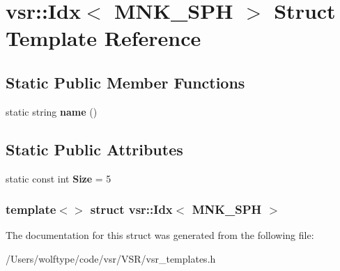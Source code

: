 \hypertarget{structvsr_1_1_idx_3_01_m_n_k___s_p_h_01_4}{\section{vsr\-:\-:Idx$<$ M\-N\-K\-\_\-\-S\-P\-H $>$ Struct Template Reference}
\label{structvsr_1_1_idx_3_01_m_n_k___s_p_h_01_4}
}
\subsection*{Static Public Member Functions}
\begin{DoxyCompactItemize}
\item 
\hypertarget{structvsr_1_1_idx_3_01_m_n_k___s_p_h_01_4_a3ed4e32adf1d5228403242992398bc75}{static string {\bfseries name} ()}\label{structvsr_1_1_idx_3_01_m_n_k___s_p_h_01_4_a3ed4e32adf1d5228403242992398bc75}

\end{DoxyCompactItemize}
\subsection*{Static Public Attributes}
\begin{DoxyCompactItemize}
\item 
\hypertarget{structvsr_1_1_idx_3_01_m_n_k___s_p_h_01_4_a4ff6fd432526189d77ff5dcb978b48ab}{static const int {\bfseries Size} = 5}\label{structvsr_1_1_idx_3_01_m_n_k___s_p_h_01_4_a4ff6fd432526189d77ff5dcb978b48ab}

\end{DoxyCompactItemize}
\subsubsection*{template$<$$>$ struct vsr\-::\-Idx$<$ M\-N\-K\-\_\-\-S\-P\-H $>$}



The documentation for this struct was generated from the following file\-:\begin{DoxyCompactItemize}
\item 
/\-Users/wolftype/code/vsr/\-V\-S\-R/vsr\-\_\-templates.\-h\end{DoxyCompactItemize}
